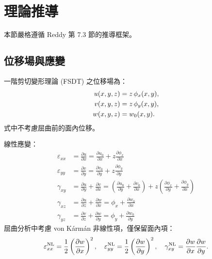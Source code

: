 \section{理論推導}

本節嚴格遵循 Reddy \cite{reddy2004} 第 7.3 節的推導框架。

\subsection{位移場與應變}
一階剪切變形理論 (FSDT) 之位移場為：
\begin{align}
u(x,y,z) &= z\,\phi_x(x,y), \notag\\
v(x,y,z) &= z\,\phi_y(x,y), \label{eq:disp}\\
w(x,y,z) &= w_0(x,y). \notag
\end{align}
式中不考慮屈曲前的面內位移。

線性應變：
\begin{align}
\varepsilon_{xx} &= \frac{\partial u}{\partial x} = \frac{\partial u_0}{\partial x} + z \frac{\partial \phi_x}{\partial x} \\
\varepsilon_{yy} &= \frac{\partial v}{\partial y} = \frac{\partial v_0}{\partial y} + z \frac{\partial \phi_y}{\partial y} \\
\gamma_{xy} &= \frac{\partial u}{\partial y} + \frac{\partial v}{\partial x} = \left( \frac{\partial u_0}{\partial y} + \frac{\partial v_0}{\partial x} \right) + z \left( \frac{\partial \phi_x}{\partial y} + \frac{\partial \phi_y}{\partial x} \right) \\
\gamma_{xz} &= \frac{\partial u}{\partial z} + \frac{\partial w}{\partial x} = \phi_x + \frac{\partial w_0}{\partial x} \\
\gamma_{yz} &= \frac{\partial v}{\partial z} + \frac{\partial w}{\partial y} = \phi_y + \frac{\partial w_0}{\partial y}
\end{align}
屈曲分析中考慮 von Kármán 非線性項，僅保留面內項：
\[
\varepsilon_{xx}^{\mathrm{NL}} = \frac{1}{2}\left(\pdv{w}{x}\right)^2,\quad
\varepsilon_{yy}^{\mathrm{NL}} = \frac{1}{2}\left(\pdv{w}{y}\right)^2,\quad
\gamma_{xy}^{\mathrm{NL}} = \pdv{w}{x}\pdv{w}{y}.
\]

